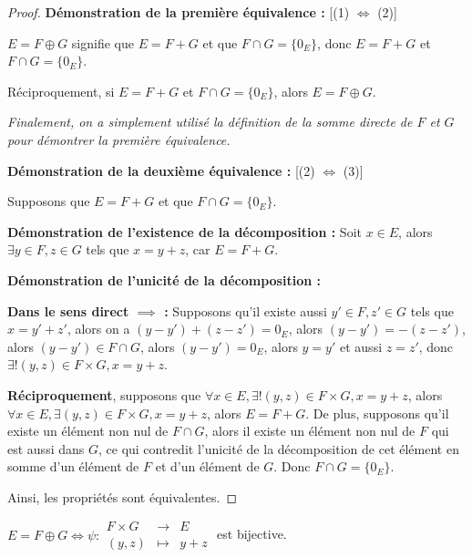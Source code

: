 \documentclass[12pt, a4paper]{report}
\begin{document}
\begin{proof}
    \textbf{Démonstration de la première équivalence :} [(1) $\iff$ (2)]

    $E = F \oplus G$ signifie que $E = F + G$ et que $F \cap G = \{0_E\}$, donc $E = F + G$ et $F \cap G = \{0_E\}$.

    Réciproquement, si $E = F + G$ et $F \cap G = \{0_E\}$, alors $E = F \oplus G$.

    \textit{Finalement, on a simplement utilisé la définition de la somme directe de $F$ et $G$ pour démontrer la première équivalence.}
    
    \textbf{Démonstration de la deuxième équivalence :} [(2) $\iff$ (3)]

    Supposons que $E = F + G$ et que $F \cap G = \{0_E\}$.

    \begin{outline}
    \1 \textbf{Démonstration de l'existence de la décomposition :} Soit $x \in E$, alors $\exists y \in F, z \in G$ tels que $x = y+z$, car $E = F + G$.

    \1 \textbf{Démonstration de l'unicité de la décomposition :}
    
    \2 \textbf{Dans le sens direct $\implies$ :} Supposons qu'il existe aussi $y' \in F, z' \in G$ tels que $x = y' + z'$, alors on a $(y-y') + (z-z') = 0_E$, alors $(y-y') = -(z-z')$, alors $(y-y') \in F\cap G$, alors $(y-y') = 0_E$, alors $y=y'$ et aussi $z=z'$, donc $\exists ! (y,z) \in F\times G, x=y+z$.

    \2 \textbf{Réciproquement}, supposons que $\forall x \in E, \exists ! (y,z) \in F\times G, x=y+z$, alors $\forall x \in E, \exists (y,z) \in F\times G, x=y+z$, alors $E=F+G$. De plus, supposons qu'il existe un élément non nul de $F\cap G$, alors il existe un élément non nul de $F$ qui est aussi dans $G$, ce qui contredit l'unicité de la décomposition de cet élément en somme d'un élément de $F$ et d'un élément de $G$. Donc $F\cap G=\{0_E\}$.
    \end{outline}

    Ainsi, les propriétés sont équivalentes.
\end{proof}

\begin{remark}
    $E = F \oplus G \iff \psi : \begin{matrix}
            F \times G & \to & E \\
            (y,z) & \mapsto & y+z
    \end{matrix}$ est bijective.
\end{remark}
\end{document}
